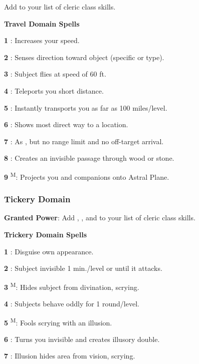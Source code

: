 Add  to your list of cleric class skills.

\textbf{Travel Domain Spells}

\textbf{1} : Increases your speed.

\textbf{2} : Senses direction toward object (specific or type).

\textbf{3} : Subject flies at speed of 60 ft.

\textbf{4} : Teleports you short distance.

\textbf{5} : Instantly transports you as far as 100 miles/level.

\textbf{6} : Shows most direct way to a location.

\textbf{7} : As , but no range limit and no off-target arrival.

\textbf{8} : Creates an invisible passage through wood or stone.

\textbf{9} \textsuperscript{M}: Projects you and companions onto Astral Plane.

\subsubsection{Tickery Domain}

\textbf{Granted Power}: Add , , and  to your list of cleric class skills.

\textbf{Trickery Domain Spells}

\textbf{1} : Disguise own appearance.

\textbf{2} : Subject invisible 1 min./level or until it attacks.

\textbf{3} \textsuperscript{M}: Hides subject from divination, scrying.

\textbf{4} : Subjects behave oddly for 1 round/level.

\textbf{5} \textsuperscript{M}: Fools scrying with an illusion.

\textbf{6} : Turns you invisible and creates illusory double.

\textbf{7} : Illusion hides area from vision, scrying.

